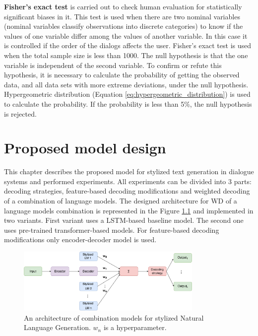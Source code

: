 \textbf{Fisher's exact test} \cite{fisher1922interpretation} is carried out to check human evaluation for statistically significant biases in it. This test is used when there are two nominal variables (nominal variables classify observations into discrete categories) to know if the values of one variable differ among the values of another variable. In this case it is controlled if the order of the dialogs affects the user. 
Fisher's exact test is used when the total sample size is less than 1000. The null hypothesis is that the one variable is independent of the second variable. To confirm or refute this hypothesis, it is necessary to calculate the probability of getting the observed data, and all data sets with more extreme deviations, under the null hypothesis. Hypergeometric distribution (Equation \ref{eq:hypergeometric_distribution}) is used to calculate the probability. If the probability is less than 5\%, the null hypothesis is rejected. 

\chapter{Proposed model design} \label{solution_design}
This chapter describes the proposed model for stylized text generation in dialogue systems and performed experiments. All experiments can be divided into 3 parts: decoding strategies, feature-based decoding modifications and weighted decoding of a combination of language models. The designed architecture for WD of a language models combination is represented in the Figure \ref{architecture_nlg} and implemented in two variants. First variant uses a LSTM-based baseline model. The second one uses pre-trained transformer-based models. For feature-based decoding modifications only encoder-decoder model is used.

\begin{figure}[hbt]
  \centering
  \includegraphics[width=0.8\textwidth]{figures/model.pdf}
  \caption{An architecture of combination models for stylized Natural Language Generation. $w_n$ is a hyperparameter.}
  \label{architecture_nlg}
\end{figure}

